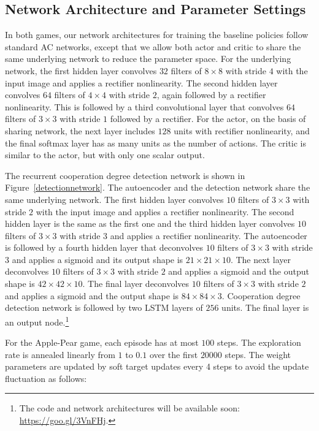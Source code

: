 \documentclass{article}
\begin{document}
\subsection{Network Architecture and Parameter Settings}
In both games, our network architectures for training the baseline policies follow standard AC networks, except that we allow both actor and critic to share the same underlying network to reduce the parameter space. For the underlying network, the first hidden layer convolves $32$ filters of $8 \times 8$ with stride $4$ with the input image and applies a rectifier nonlinearity. The second hidden layer convolves $64$ filters of $4 \times 4$ with stride $2$, again followed by a rectifier nonlinearity. This is followed by a third convolutional layer that convolves $64$ filters of $3 \times 3$ with stride $1$ followed by a rectifier. For the actor, on the basis of sharing network, the next layer includes $128$ units with rectifier nonlinearity, and the final softmax layer has as many units as the number of actions. The critic is similar to the actor, but with only one scalar output.

The recurrent cooperation degree detection network is shown in Figure~\ref{detectionnetwork}. The autoencoder and the detection network share the same underlying network. The first hidden layer convolves $10$ filters of $3 \times 3$ with stride $2$ with the input image and applies a rectifier nonlinearity. The second hidden layer is the same as the first one and the third hidden layer convolves $10$ filters of $3 \times 3$ with stride $3$ and applies a rectifier nonlinearity. The autoencoder is followed by a fourth hidden layer that deconvolves $10$ filters of $3 \times 3$ with stride $3$ and applies a sigmoid and its output shape is $21 \times 21 \times 10$. The next layer deconvolves $10$ filters of $3 \times 3$ with stride $2$ and applies a sigmoid and the output shape is $42 \times 42 \times 10$. The final layer deconvolves $10$ filters of $3 \times 3$ with stride $2$ and applies a sigmoid and the output shape is $84 \times 84 \times 3$. Cooperation degree detection network is followed by two LSTM layers of $256$ units. The final layer is an output node.\footnote{The code and network architectures will be available soon: \url{https://goo.gl/3VnFHj}.}

For the Apple-Pear game, each episode has at most $100$ steps. The exploration rate is annealed linearly from $1$ to $0.1$ over the first $20000$ steps. The weight parameters are updated by soft target updates \cite{lillicrap2015continuous} every 4 steps to avoid the update fluctuation as follows:
\end{document}
